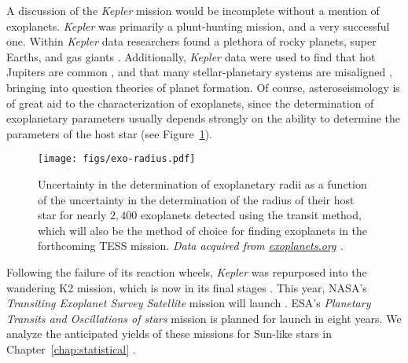 A discussion of the \emph{Kepler} mission would be incomplete without a mention of exoplanets. 
\emph{Kepler} was primarily a plunt-hunting mission, and a very successful one. 
Within \emph{Kepler} data researchers found a plethora of rocky planets, super Earths, and gas giants \citep[e.g.,][]{2008ApJ...680.1450P, 2011ApJ...729...27B, 2012ApJ...745..120B, 2014ApJS..210...20M}. 
Additionally, \emph{Kepler} data were used to find that hot Jupiters are common \citep{2008ApJ...680.1450P}, and that many stellar-planetary systems are misaligned \citep{2013Sci...342..331H}, bringing into question theories of planet formation. 
Of course, asteroseismology is of great aid to the characterization of exoplanets, since the determination of exoplanetary parameters usually depends strongly on the ability to determine the parameters of the host star (see Figure~\ref{fig:exoplanets}). 

\begin{figure}
    \centering
    \begin{minipage}[c]{0.5\textwidth}%
        \texttt{[image: figs/exo-radius.pdf]}%
    \end{minipage}%
    \hfill
    \begin{minipage}[c]{0.45\textwidth}
        \caption[Exoplanetary uncertainty vs.~host star uncertainty]{Uncertainty in the determination of exoplanetary radii as a function of the uncertainty in the determination of the radius of their host star for nearly $2,400$ exoplanets detected using the transit method, which will also be the method of choice for finding exoplanets in the forthcoming TESS mission. 
        \emph{Data acquired from \href{http://exoplanets.org}{exoplanets.org} \citep{2014PASP..126..827H}.}
        \label{fig:exoplanets}}
    \end{minipage}
\end{figure}

Following the failure of its reaction wheels, \emph{Kepler} was repurposed into the wandering K2 mission, which is now in its final stages \citep[][duration 2013--2018]{2014PASP..126..398H}. 
This year, NASA's \emph{Transiting Exoplanet Survey Satellite} mission will launch \citep[TESS,][expected 2018--2020]{2010AAS...21545006R}. 
ESA's \emph{Planetary Transits and Oscillations of stars} mission \citep[PLATO,][expected 2026--2030]{2014ExA....38..249R} is planned for launch in eight years. 
We analyze the anticipated yields of these missions for Sun-like stars in Chapter~\ref{chap:statistical} \citep{2017apj...839..116a}. 



